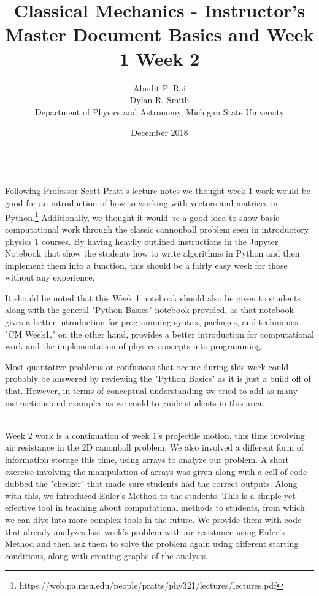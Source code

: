 \documentclass[12pt, letterpaper, twoside]{report}
\title{Classical Mechanics - Instructor's Master Document}
\author{
	Abudit P. Rai\\
    Dylan R. Smith\\ Department of Physics and Astronomy, Michigan State University}
\date{December 2018}
\begin{document}
\begin{titlepage}
\maketitle
\end{titlepage}

\title{
    \large{Basics and Week 1}}\\

Following Professor Scott Pratt's lecture notes we thought week 1 work would be good for an introduction of how to working with vectors and matrices in Python.\thanks{https://web.pa.msu.edu/people/pratts/phy321/lectures/lectures.pdf} Additionally, we thought it would be a good idea to show basic computational work through the classic cannonball problem seen in introductory physics 1 courses. By having heavily outlined instructions in the Jupyter Notebook that show the students how to write algorithms in Python and then implement them into a function, this should be a fairly easy week for those without any experience.

It should be noted that this Week 1 notebook should also be given to students along with the general "Python Basics" notebook provided, as that notebook gives a better introduction for programming syntax, packages, and techniques. "CM Week1," on the other hand, provides a better introduction for computational work and the implementation of physics concepts into programming.

Most quantative problems or confusions that occure during this week could probably be answered by reviewing the "Python Basics" as it is just a build off of that. However, in terms of conceptual understanding we tried to add as many instructions and examples as we could to guide students in this area.

\newpage
\title{
	\large{Week 2}}\\

Week 2 work is a continuation of week 1's projectile motion, this time involving air resistance in the 2D canonball problem. We also involved a different form of information storage this time, using arrays to analyze our problem. A short exercise involving the manipulation of arrays was given along with a cell of code dubbed the "checker" that made sure students had the correct outputs. Along with this, we introduced Euler's Method to the students. This is a simple yet effective tool in teaching about computational methods to students, from which we can dive into more complex tools in the future. We provide them with code that already analyzes last week's problem with air resistance using Euler's Method and then ask them to solve the problem again using different starting conditions, along with creating graphs of the analysis.
\end{document}
